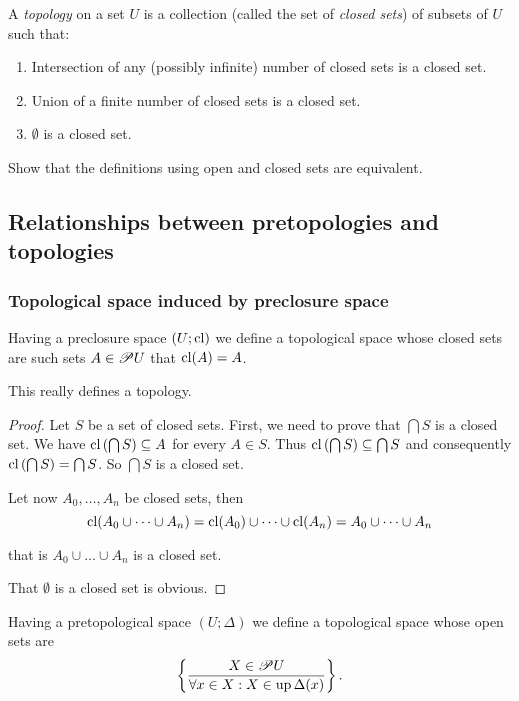 A \emph{topology} on a set $U$ is a collection (called the set of
\emph{closed sets}) of subsets of $U$ such that:
\begin{enumerate}
\item Intersection of any (possibly infinite) number of closed sets is a
closed set.
\item Union of a finite number of closed sets is a closed set.
\item $\emptyset$ is a closed set.\end{enumerate}
\begin{xca}
Show that the definitions using open and closed sets are equivalent.
\end{xca}

\subsection{Relationships between pretopologies and topologies}


\subsubsection{Topological space induced by preclosure space}

Having a preclosure
space $(U;\operatorname{cl})$ we define a topological space whose closed sets are
such sets $A\in\mathscr{P} U$ that $\operatorname{cl}(A)=A$.
\begin{prop}
This really defines a topology.\end{prop}
\begin{proof}
Let $S$ be a set of closed sets. First, we need to prove that $\bigcap S$
is a closed set. We have $\operatorname{cl}\left(\bigcap S\right)\subseteq A$ for
every $A\in S$. Thus $\operatorname{cl}\left(\bigcap S\right)\subseteq\bigcap S$
and consequently $\operatorname{cl}\left(\bigcap S\right)=\bigcap S$. So $\bigcap S$
is a closed set.

Let now $A_{0},\dots,A_{n}$ be closed sets, then
\[
\operatorname{cl}(A_{0}\cup\dots\cup A_{n})=\operatorname{cl}(A_{0})\cup\dots\cup\operatorname{cl}(A_{n})=A_{0}\cup\dots\cup A_{n}
\]


that is $A_{0}\cup\dots\cup A_{n}$ is a closed set.

That $\emptyset$ is a closed set is obvious.
\end{proof}
Having a pretopological space $(U;\Delta)$ we define a topological
space whose open sets are
\[
\left\{ \frac{X\in\mathscr{P} U}{\forall x\in X:X\in\operatorname{up}\Delta(x)}\right\}.
\]

